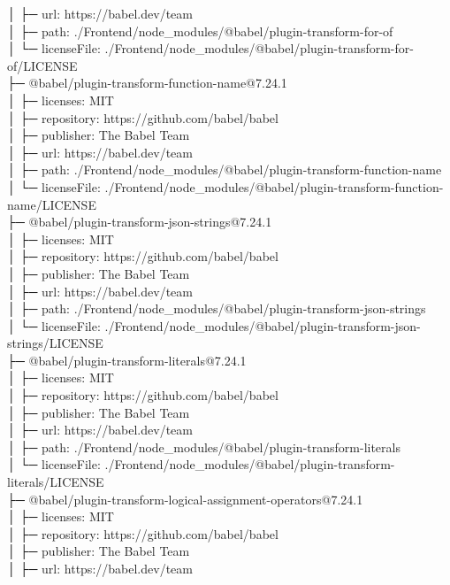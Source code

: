 │  ├─ url: https://babel.dev/team\\
│  ├─ path: ./Frontend/node\_modules/@babel/plugin-transform-for-of\\
│  └─ licenseFile: ./Frontend/node\_modules/@babel/plugin-transform-for-of/LICENSE\\
├─ @babel/plugin-transform-function-name@7.24.1\\
│  ├─ licenses: MIT\\
│  ├─ repository: https://github.com/babel/babel\\
│  ├─ publisher: The Babel Team\\
│  ├─ url: https://babel.dev/team\\
│  ├─ path: ./Frontend/node\_modules/@babel/plugin-transform-function-name\\
│  └─ licenseFile: ./Frontend/node\_modules/@babel/plugin-transform-function-name/LICENSE\\
├─ @babel/plugin-transform-json-strings@7.24.1\\
│  ├─ licenses: MIT\\
│  ├─ repository: https://github.com/babel/babel\\
│  ├─ publisher: The Babel Team\\
│  ├─ url: https://babel.dev/team\\
│  ├─ path: ./Frontend/node\_modules/@babel/plugin-transform-json-strings\\
│  └─ licenseFile: ./Frontend/node\_modules/@babel/plugin-transform-json-strings/LICENSE\\
├─ @babel/plugin-transform-literals@7.24.1\\
│  ├─ licenses: MIT\\
│  ├─ repository: https://github.com/babel/babel\\
│  ├─ publisher: The Babel Team\\
│  ├─ url: https://babel.dev/team\\
│  ├─ path: ./Frontend/node\_modules/@babel/plugin-transform-literals\\
│  └─ licenseFile: ./Frontend/node\_modules/@babel/plugin-transform-literals/LICENSE\\
├─ @babel/plugin-transform-logical-assignment-operators@7.24.1\\
│  ├─ licenses: MIT\\
│  ├─ repository: https://github.com/babel/babel\\
│  ├─ publisher: The Babel Team\\
│  ├─ url: https://babel.dev/team\\
